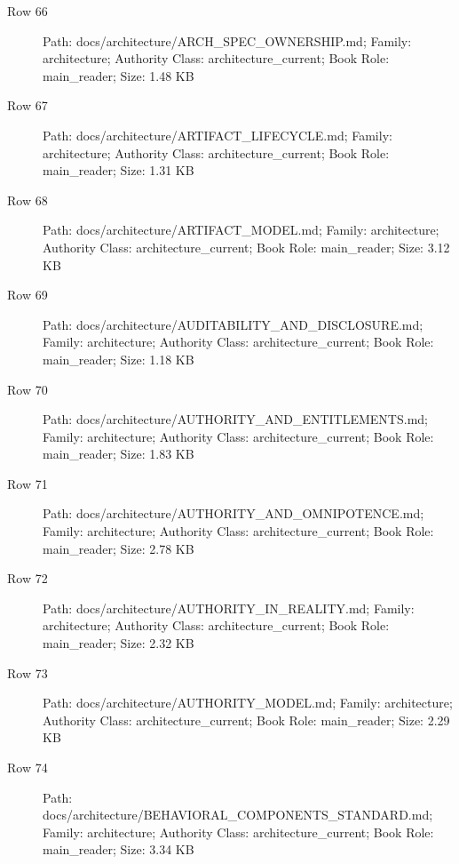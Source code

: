 \documentclass[9pt,a4paper]{book}
\begin{document}
\begin{description}
\item[Row 66] Path: docs/\allowbreak{}architecture/\allowbreak{}ARCH\_\allowbreak{}SPEC\_\allowbreak{}OWNERSHIP.\allowbreak{}md; Family: architecture; Authority Class: architecture\_\allowbreak{}current; Book Role: main\_\allowbreak{}reader; Size: 1.\allowbreak{}48 KB
\item[Row 67] Path: docs/\allowbreak{}architecture/\allowbreak{}ARTIFACT\_\allowbreak{}LIFECYCLE.\allowbreak{}md; Family: architecture; Authority Class: architecture\_\allowbreak{}current; Book Role: main\_\allowbreak{}reader; Size: 1.\allowbreak{}31 KB
\item[Row 68] Path: docs/\allowbreak{}architecture/\allowbreak{}ARTIFACT\_\allowbreak{}MODEL.\allowbreak{}md; Family: architecture; Authority Class: architecture\_\allowbreak{}current; Book Role: main\_\allowbreak{}reader; Size: 3.\allowbreak{}12 KB
\item[Row 69] Path: docs/\allowbreak{}architecture/\allowbreak{}AUDITABILITY\_\allowbreak{}AND\_\allowbreak{}DISCLOSURE.\allowbreak{}md; Family: architecture; Authority Class: architecture\_\allowbreak{}current; Book Role: main\_\allowbreak{}reader; Size: 1.\allowbreak{}18 KB
\item[Row 70] Path: docs/\allowbreak{}architecture/\allowbreak{}AUTHORITY\_\allowbreak{}AND\_\allowbreak{}ENTITLEMENTS.\allowbreak{}md; Family: architecture; Authority Class: architecture\_\allowbreak{}current; Book Role: main\_\allowbreak{}reader; Size: 1.\allowbreak{}83 KB
\item[Row 71] Path: docs/\allowbreak{}architecture/\allowbreak{}AUTHORITY\_\allowbreak{}AND\_\allowbreak{}OMNIPOTENCE.\allowbreak{}md; Family: architecture; Authority Class: architecture\_\allowbreak{}current; Book Role: main\_\allowbreak{}reader; Size: 2.\allowbreak{}78 KB
\item[Row 72] Path: docs/\allowbreak{}architecture/\allowbreak{}AUTHORITY\_\allowbreak{}IN\_\allowbreak{}REALITY.\allowbreak{}md; Family: architecture; Authority Class: architecture\_\allowbreak{}current; Book Role: main\_\allowbreak{}reader; Size: 2.\allowbreak{}32 KB
\item[Row 73] Path: docs/\allowbreak{}architecture/\allowbreak{}AUTHORITY\_\allowbreak{}MODEL.\allowbreak{}md; Family: architecture; Authority Class: architecture\_\allowbreak{}current; Book Role: main\_\allowbreak{}reader; Size: 2.\allowbreak{}29 KB
\item[Row 74] Path: docs/\allowbreak{}architecture/\allowbreak{}BEHAVIORAL\_\allowbreak{}COMPONENTS\_\allowbreak{}STANDARD.\allowbreak{}md; Family: architecture; Authority Class: architecture\_\allowbreak{}current; Book Role: main\_\allowbreak{}reader; Size: 3.\allowbreak{}34 KB

\end{description}
\end{document}
